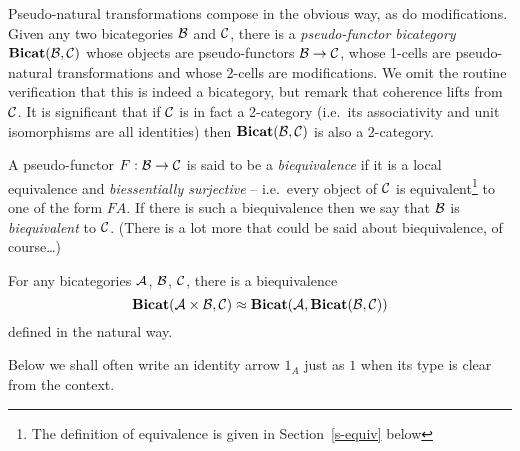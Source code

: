 \documentclass{robinthesisdraft}
\begin{document}
Pseudo-natural transformations compose in the obvious way, as do modifications.
Given any two bicategories $\mathcal{B}$ and $\mathcal{C}$, there is a \emph{pseudo-functor bicategory}
$\mathbf{Bicat}(\mathcal{B},\mathcal{C})$ whose objects are pseudo-functors $\mathcal{B}\to\mathcal{C}$,
whose 1-cells are pseudo-natural transformations and whose
2-cells are modifications. We omit the routine verification that
this is indeed a bicategory, but remark that coherence lifts from
$\mathcal{C}$. It is significant that if $\mathcal{C}$ is in fact a 2-category
(i.e.\ its associativity and unit isomorphisms are all identities) then
$\mathbf{Bicat}(\mathcal{B},\mathcal{C})$ is also a 2-category.

A pseudo-functor $F:\mathcal{B}\to\mathcal{C}$ is said to be a \emph{biequivalence}
if it is a local equivalence and \emph{biessentially surjective} -- i.e.\ every
object of $\mathcal{C}$ is equivalent\footnote{The definition of equivalence is
given in Section~\ref{s-equiv} below}
to one of the form $FA$. If there is such a
biequivalence then we say that $\mathcal{B}$ is \emph{biequivalent} to $\mathcal{C}$.
(There is a lot more that could be said about biequivalence, of course\dots)

For any bicategories $\mathcal{A}$, $\mathcal{B}$, $\mathcal{C}$, there is a biequivalence
\[
	\mathbf{Bicat}(\mathcal{A}\times\mathcal{B}, \mathcal{C}) \approx \mathbf{Bicat}(\mathcal{A}, \mathbf{Bicat}(\mathcal{B},\mathcal{C}))
\]
defined in the natural way.
% 

Below we shall often write
an identity arrow $1_A$ just as $1$ when its type is clear from the context.
\end{document}

